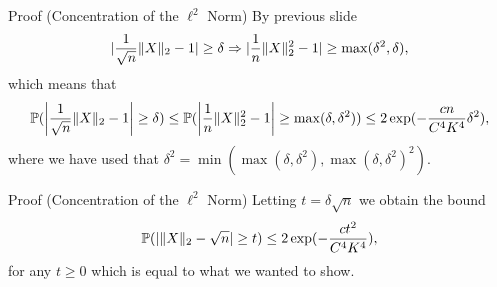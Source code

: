 \documentclass{beamer}
\begin{document}
  \begin{frame}{Proof (Concentration of the \(\ell^{2}\) Norm)}
    By previous slide
    \begin{equation}
      \abs{\frac{1}{\sqrt{n}}\norm{X}_{2} - 1} \geq \delta \Rightarrow \abs{\frac{1}{n}\norm{X}^{2}_{2} - 1} \geq \max(\delta^{2}, \delta),
    \end{equation}
    \pause which means that
    \begin{equation}
      \Pr(\abs*{\frac{1}{\sqrt{n}}\norm{X}_{2} - 1} \geq \delta) \leq \Pr(\abs*{\frac{1}{n}\norm{X}^{2}_{2} - 1} \geq \max(\delta, \delta^{2})) \leq 2 \exp(-\frac{cn}{C^{4}K^{4}}\delta^{2}),
    \end{equation}
    where we have used that \(\delta^{2} = \min(\max(\delta, \delta^{2}), \max(\delta, \delta^{2})^{2})\).
  \end{frame}

  \begin{frame}{Proof (Concentration of the \(\ell^{2}\) Norm)}
    Letting \(t = \delta \sqrt{n}\) we obtain the bound
    \begin{equation}
      \Pr(\abs{\norm{X}_{2} - \sqrt{n}} \geq t) \leq 2\exp(-\frac{ct^{2}}{C^{4}K^{4}}),
    \end{equation}
    for any \(t \geq 0\) which is equal to what we wanted to show.
  \end{frame}
\end{document}

